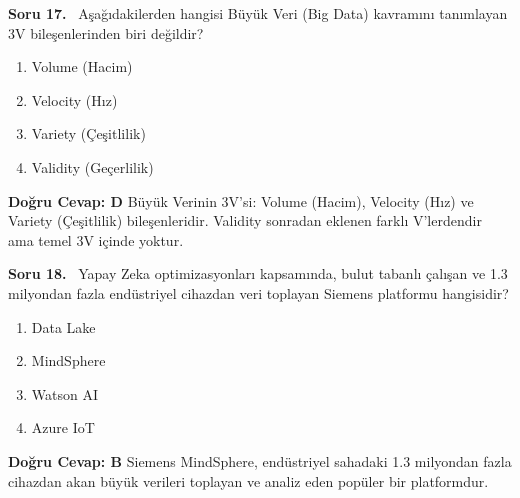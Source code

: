 \documentclass[11pt,a4paper,openany]{book}
\begin{document}
\needspace{5cm}
\vspace{8pt}
\noindent\textbf{\large\sffamily Soru 17.} \ Aşağıdakilerden hangisi Büyük Veri (Big Data) kavramını tanımlayan 3V bileşenlerinden biri değildir?
\begin{enumerate}[label=\Alph*), leftmargin=25pt, topsep=4pt, itemsep=2pt]
    \item Volume (Hacim)
    \item Velocity (Hız)
    \item Variety (Çeşitlilik)
    \item Validity (Geçerlilik)
\end{enumerate}
\vspace{4pt}
\begin{tcolorbox}[title=Cevap ve Açıklama, colback=gray!3!white, colframe=primarycolor!90!black, arc=2mm, fonttitle=\bfseries\sffamily, top=6pt, bottom=6pt]
    \textbf{Doğru Cevap: D}
    \vspace{2pt}
    Büyük Verinin 3V'si: Volume (Hacim), Velocity (Hız) ve Variety (Çeşitlilik) bileşenleridir. Validity sonradan eklenen farklı V'lerdendir ama temel 3V içinde yoktur.
\end{tcolorbox}
\vspace{10pt}

\needspace{5cm}
\vspace{8pt}
\noindent\textbf{\large\sffamily Soru 18.} \ Yapay Zeka optimizasyonları kapsamında, bulut tabanlı çalışan ve 1.3 milyondan fazla endüstriyel cihazdan veri toplayan Siemens platformu hangisidir?
\begin{enumerate}[label=\Alph*), leftmargin=25pt, topsep=4pt, itemsep=2pt]
    \item Data Lake
    \item MindSphere
    \item Watson AI
    \item Azure IoT
\end{enumerate}
\vspace{4pt}
\begin{tcolorbox}[title=Cevap ve Açıklama, colback=gray!3!white, colframe=primarycolor!90!black, arc=2mm, fonttitle=\bfseries\sffamily, top=6pt, bottom=6pt]
    \textbf{Doğru Cevap: B}
    \vspace{2pt}
    Siemens MindSphere, endüstriyel sahadaki 1.3 milyondan fazla cihazdan akan büyük verileri toplayan ve analiz eden popüler bir platformdur.
\end{tcolorbox}
\vspace{10pt}
\end{document}
